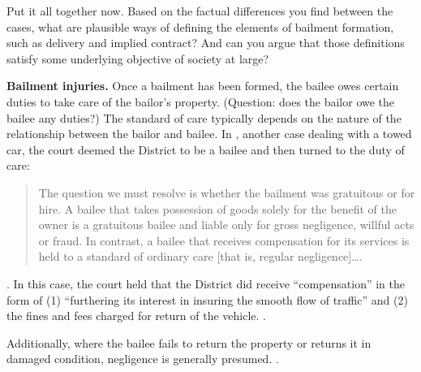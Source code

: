 Put it all together now. Based on the factual differences you find between the
cases, what are plausible ways of defining the elements of bailment formation,
such as delivery and implied contract? And can you argue that those definitions
satisfy some underlying objective of society at large?


\item \textbf{Bailment injuries.} Once a bailment has been formed, the bailee
owes certain duties to take care of the bailor's property. (Question: does the
bailor owe the bailee any duties?) The standard of care typically depends on the
nature of the relationship between the bailor and bailee. In
, another case dealing with a towed car, the court deemed
the District to be a bailee and then turned to the duty of care:
\begin{quote}
The question we must resolve is whether the bailment was gratuitous or for hire.
A bailee that takes possession of goods solely for the benefit of the owner is a
gratuitous bailee and liable only for gross negligence, willful acts or fraud.
In contrast, a bailee that receives compensation for its services is
held to a standard of ordinary care [that is, regular negligence]\ldots.
\end{quote}
. In this case, the court held that the District
did receive ``compensation'' in the form of (1) ``furthering its interest in
insuring the smooth flow of traffic'' and (2) the fines and fees charged for
return of the vehicle. .


Additionally, where the bailee fails to return the property or returns it in
damaged condition, negligence is generally presumed. .
